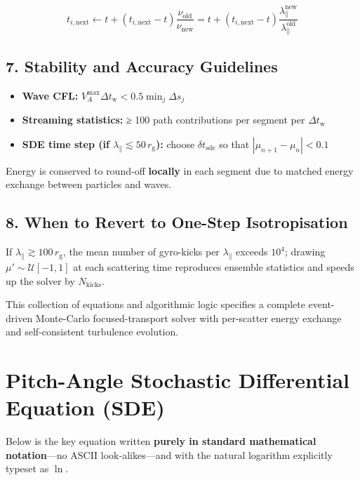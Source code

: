 {\[
t_{i,\mathrm{next}} \leftarrow t + (t_{i,\mathrm{next}} - t) \frac{\nu_{\mathrm{old}}}{\nu_{\mathrm{new}}}
= t + (t_{i,\mathrm{next}} - t) \frac{\lambda_{\parallel}^{\text{new}}}{\lambda_{\parallel}^{\text{old}}}
\]

\subsection*{7. Stability and Accuracy Guidelines}

\begin{itemize}
  \item \textbf{Wave CFL:} \( V_A^{\max} \Delta t_{\mathrm{w}} < 0.5 \min_j \Delta s_j \)
  \item \textbf{Streaming statistics:} ≥ 100 path contributions per segment per \( \Delta t_{\mathrm{w}} \)
  \item \textbf{SDE time step (if \( \lambda_{\parallel} \lesssim 50\,r_{\mathrm{g}} \)):} choose \( \delta t_{\text{sde}} \) so that \( |\mu_{n+1} - \mu_n| < 0.1 \)
\end{itemize}

Energy is conserved to round-off \textbf{locally} in each segment due to matched energy exchange between particles and waves.

\subsection*{8. When to Revert to One-Step Isotropisation}

If \( \lambda_{\parallel} \gtrsim 100\,r_{\mathrm{g}} \), the mean number of gyro-kicks per \( \lambda_{\parallel} \) exceeds \( 10^4 \); drawing
\( \mu' \sim \mathcal{U}[-1,1] \) at each scattering time reproduces ensemble statistics and speeds up the solver by \( N_{\mathrm{kicks}} \).

\bigskip

\noindent
This collection of equations and algorithmic logic specifies a complete event-driven Monte-Carlo focused-transport solver with per-scatter energy exchange and self-consistent turbulence evolution.

\section*{Pitch-Angle Stochastic Differential Equation (SDE)}

Below is the key equation written \textbf{purely in standard mathematical notation}—no ASCII look-alikes—and with the natural logarithm explicitly typeset as \( \ln \).

}
